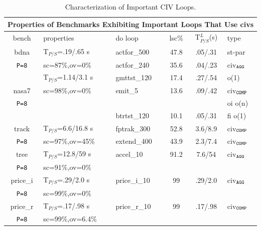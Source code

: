 \documentclass{sig-alternate}
\begin{document}
\begin{table}[t] 
\centering
\scriptsize   
\begin{tabular}{|c|l|l|c|c|l|} \hline
\multicolumn{6}{|c|}{Properties of Benchmarks Exhibiting Important Loops That Use {\sc civ}s} \\ \hline
{\sc bench} & {\sc properties} & {\sc do loop}  & {\sc lsc}\%  & T$_{P/S}^L$(s) & {\sc type} \\ \hline
{\sc bdna}  &  T$_{P/S}$=.19/.65 s         & {\sc actfor\_500}  & 47.8 & .05/.31 & {\sc st-par}     \\ 
{\tt P=8}         &  {\sc sc}=87\%,{\sc ov}=0\%  & {\sc actfor\_240}  & 35.6 & .04/.23 & {\sc civ}$_{\tt{}AGG}$    \\ \hline 
             &  T$_{P/S}$=1.14/3.1 s         & {\sc gmttst\_120}  & 17.4 & .27/.54 & {\sc {\sc fi} {\sc o(1)}}   \\ 
{\sc nasa7}  &  {\sc sc}=98\%,{\sc ov}=0\%  & {\sc emit\_5}      & 13.6 & .09/.42 & {\sc civ}$_{\tt{}COMP}$   \\  %
{\tt P=8}        &                              &                      &                & & {\sc oi} {\sc o(n)}       \\
             &                              & {\sc btrtst\_120}  & 10.1 & .05/.31 & {\sc fi} {\sc o(1)}        \\ \hline
{\sc track}  &  T$_{P/S}$=6.6/16.8 s         & {\sc fptrak\_300}  & 52.8 & 3.6/8.9 & {\sc civ}$_{\tt{}COMP}$   \\ 
{\tt P=8}        &  {\sc sc}=97\%,{\sc ov}=45\%  & {\sc extend\_400}  & 43.9 & 2.3/7.4 & {\sc civ}$_{\tt{}COMP}$ \\ \hline 
{\sc tree}   &  T$_{P/S}$=12.8/59 s        & {\sc accel\_10}    & 91.2 & 7.6/54 & {\sc civ}$_{\tt{}AGG}$  \\            %
{\tt P=8}        &  {\sc sc}=91\%,{\sc ov}=0\% &                    &      &          &                           \\ \hline 
{\sc price\_i} &  T$_{P/S}$=.29/2.0 s        & {\sc price\_i\_10} & 99   & .29/2.0  & {\sc civ}$_{\tt{}AGG}$ \\ 
{\tt P=8}          &  {\sc sc}=99\%,{\sc ov}=0\% &                    &      &          &                           \\ \hline 
{\sc price\_r} &  T$_{P/S}$=.17/.98 s          & {\sc price\_r\_10}& 99   & .17/.98  & {\sc civ}$_{\tt{}COMP}$ \\ 
{\tt P=8}          &  {\sc sc}=99\%,{\sc ov}=6.4\% &                  &      &          &                          \\ \hline 
\end{tabular}
\caption{ Characterization of Important CIV Loops.
}
\label{tab:LoopBenchProps}
\end{table}
\end{document}
